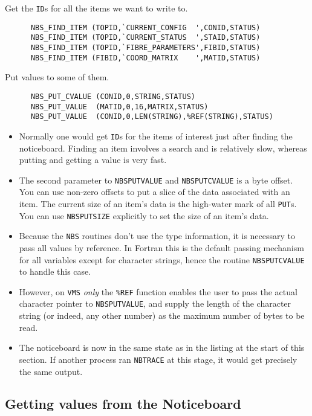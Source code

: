 \documentclass[twoside,11pt]{article}
\renewcommand{\_}{\texttt{\symbol{95}}}
\begin{document}
Get the {\tt ID}s for all the items we want to write to.

\begin {verbatim}
      NBS_FIND_ITEM (TOPID,`CURRENT_CONFIG  ',CONID,STATUS)
      NBS_FIND_ITEM (TOPID,`CURRENT_STATUS  ',STAID,STATUS)
      NBS_FIND_ITEM (TOPID,`FIBRE_PARAMETERS',FIBID,STATUS)
      NBS_FIND_ITEM (FIBID,`COORD_MATRIX    ',MATID,STATUS)
\end{verbatim}

Put values to some of them.

\begin {verbatim}
      NBS_PUT_CVALUE (CONID,0,STRING,STATUS)
      NBS_PUT_VALUE  (MATID,0,16,MATRIX,STATUS)
      NBS_PUT_VALUE  (CONID,0,LEN(STRING),%
\end{verbatim}

\begin {itemize}
\item Normally one would get {\tt ID}s for the items of interest just after
finding the noticeboard. Finding an item involves a search and is relatively
slow, whereas putting and getting a value is very fast.
\item The second parameter to {\tt NBS\_PUT\_VALUE} and {\tt NBS\_PUT\_CVALUE} 
is a byte offset. You
can use non-zero offsets to put a slice of the data associated with an item.
The current size of an item's data is the high-water mark of all {\tt PUT}s.
You can use {\tt NBS\_PUT\_SIZE} explicitly to set the size of an item's data.
\item Because the {\tt NBS} routines don't use the type information, it is
necessary to pass all values by reference. In Fortran this is the default
passing mechanism for all variables except for character strings, hence the 
routine {\tt NBS\_PUT\_CVALUE} to handle this case.
\item However, on {\tt VMS} {\em only} the {\tt \%REF} function enables the 
user to pass the actual character pointer to {\tt NBS\_PUT\_VALUE}, and supply
the length of the character string (or indeed, any other number) as the 
maximum number of bytes to be read.
\item The noticeboard is now in the same state as in the listing at the start
of this section. If another process ran {\tt NBTRACE} at this stage, it would get
precisely the same output.
\end {itemize}

\subsection {Getting values from the Noticeboard}
\end{document}
